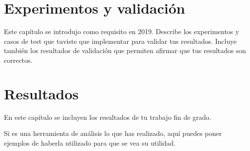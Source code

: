 \documentclass[a4paper, 12pt]{book}
\begin{document}
 




\cleardoublepage
\chapter{Experimentos y validación}
\label{chap:experimentos}

Este capítulo se introdujo como requisito en 2019. 
Describe los experimentos y casos de test que tuviste que implementar para validar tus resultados. 
Incluye también los resultados de validación que permiten afirmar que tus resultados son correctos. 



\cleardoublepage
\chapter{Resultados}
\label{chap:resultados}

En este capítulo se incluyen los resultados de tu trabajo fin de grado.

Si es una herramienta de análisis lo que has realizado, aquí puedes poner ejemplos de haberla utilizado para que se vea su utilidad.


\end{document}
